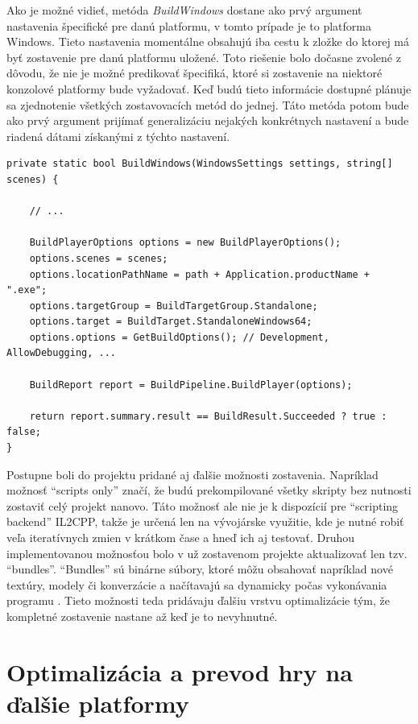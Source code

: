 \documentclass[slovak, bachelorpractice]{diploma}
\begin{document}
Ako je možné vidieť, metóda \textit{BuildWindows} dostane ako prvý argument nastavenia špecifické pre danú platformu, v tomto prípade je to platforma Windows. Tieto nastavenia momentálne obsahujú iba cestu k zložke do ktorej má byť zostavenie pre danú platformu uložené. Toto riešenie bolo dočasne zvolené z dôvodu, že nie je možné predikovať špecifiká, ktoré si zostavenie na niektoré konzolové platformy bude vyžadovať. Keď budú tieto informácie dostupné plánuje sa zjednotenie všetkých zostavovacích metód do jednej. Táto metóda potom bude ako prvý argument prijímať generalizáciu nejakých konkrétnych nastavení a bude riadená dátami získanými z týchto nastavení.

\vspace{10pt}
\begin{lstlisting}[label=src:bwin,caption={Nastavenie a spustenie programového zostavenia hry pre OS Windows}]
private static bool BuildWindows(WindowsSettings settings, string[] scenes) {

	// ...
	
    BuildPlayerOptions options = new BuildPlayerOptions();
    options.scenes = scenes;
    options.locationPathName = path + Application.productName + ".exe";
    options.targetGroup = BuildTargetGroup.Standalone;
    options.target = BuildTarget.StandaloneWindows64;
    options.options = GetBuildOptions(); // Development, AllowDebugging, ...

    BuildReport report = BuildPipeline.BuildPlayer(options);
    
    return report.summary.result == BuildResult.Succeeded ? true : false;
}
\end{lstlisting}

Postupne boli do projektu pridané aj ďalšie možnosti zostavenia. Napríklad možnosť \enquote{scripts only} značí, že budú prekompilované všetky skripty bez nutnosti zostaviť celý projekt nanovo. Táto možnosť ale nie je k dispozícií pre \enquote{scripting backend} IL2CPP, takže je určená len na vývojárske využitie, kde je nutné robiť veľa iteratívnych zmien v krátkom čase a hneď ich aj testovať. Druhou implementovanou možnosťou bolo v už zostavenom projekte aktualizovať len tzv. \enquote{bundles}. \enquote{Bundles} sú binárne súbory, ktoré môžu obsahovať napríklad nové textúry, modely či konverzácie a načítavajú sa dynamicky počas vykonávania programu \cite{Bundles}. Tieto možnosti teda pridávaju ďalšiu vrstvu optimalizácie tým, že kompletné zostavenie nastane až keď je to nevyhnutné.

\section{Optimalizácia a prevod hry na ďalšie platformy}
\label{sec:Port}
\end{document}
